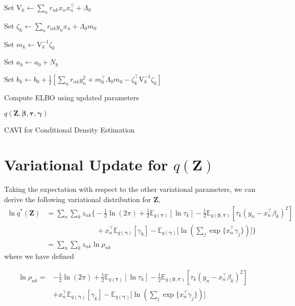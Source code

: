 \documentclass[twoside,11pt]{article}
\newcommand{\tr}{\intercal}
\newcommand{\transpose}[1]{#1^{\intercal}}
\newcommand{\nsum}{\sum_{n}}
\newcommand{\boldbeta}{\boldsymbol\beta}
\newcommand{\boldgamma}{\boldsymbol\gamma}
\newcommand{\boldtau}{\boldsymbol\tau}
\newcommand{\E}{\mathbb{E}}
\begin{document}
\begin{algorithm}[H]
{{   Set $\mathrm{V}_k \leftarrow \nsum r_{nk} x_n \transpose{x_n} + \Lambda_0$ \; %
   
   Set $\zeta_k \leftarrow \sum_{n} r_{nk} y_n x_n + \Lambda_0 m_0$\; %
   
   Set $m_k \leftarrow \mathrm{V}_k^{-1} \zeta_k$\; %
   
   Set $a_k \leftarrow a_0 + N_k$\; %
   
   Set $b_k \leftarrow b_0 + \frac{1}{2}[\nsum r_{nk} y_n^2 + \transpose{m_0}\Lambda_0 m_0 - \transpose{\zeta_k} \mathrm{V}_k^{-1} \zeta_k]$\; %
   }
   Compute ELBO using updated parameters
 } %
 \Return $q \left( \mathbf{Z}, \boldbeta, \boldtau, \boldgamma \right)$
 \caption{CAVI for Conditional Density Estimation}
\end{algorithm}


\newpage

\appendix
\section{Variational Update for $q(\mathbf{Z})$} 
\label{app:q_z}

Taking the expectation with respect to the other variational parameters, we can derive the following variational distribution for $\mathbf{Z}$,
\begin{align*}
	\ln q^{*}(\mathbf{Z}) &= \sum_n \sum_k z_{nk} \Bigg\{  -\frac{1}{2}\ln(2\pi) + \frac{1}{2} \E_{q(\boldsymbol\tau)}[ \ln \tau_k ] - \frac{1}{2} \E_{q(\boldsymbol\beta, \boldsymbol\tau)}[\tau_k (y_n - x_n^{\tr}\beta_k)^2] \\ 
	&\qquad \qquad \qquad \quad + x_n^{\tr}\E_{q(\boldsymbol\gamma)}[\gamma_k] - \E_{q(\boldsymbol\gamma)}\Bigg[\ln ( \sum_{j} \exp \{ x_n^{\tr} \gamma_j \})\Bigg]\Bigg\} \\
	&= \sum_n \sum_k z_{nk} \ln \rho_{nk}
\end{align*}
where we have defined 

\begin{equation} \label{eq:ln_rho}
\begin{split}
 \ln \rho_{nk} = &-\frac{1}{2}\ln(2\pi) + \frac{1}{2} \E_{q(\boldsymbol\tau)}[ \ln \tau_k ] - \frac{1}{2} \E_{q(\boldsymbol\beta, \boldsymbol\tau)}[\tau_k (y_n - x_n^{\tr}\beta_k)^2] \\ 
	& + x_n^{\tr}\E_{q(\boldsymbol\gamma)}[\gamma_k] - \E_{q(\boldsymbol\gamma)}\Bigg[\ln \left( \sum_{j} \exp \{ x_n^{\tr} \gamma_j \}\right)\Bigg]
\end{split}
\end{equation}
\end{document}

